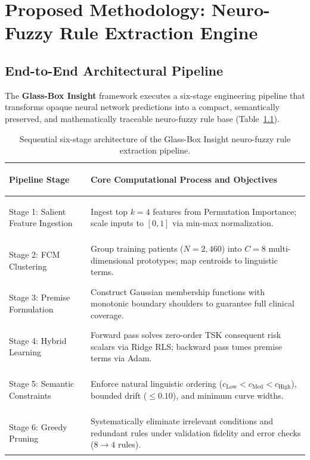 \documentclass{report}
\begin{document}
\chapter{Proposed Methodology: Neuro-Fuzzy Rule Extraction Engine}

\section{End-to-End Architectural Pipeline}

The \textbf{Glass-Box Insight} framework executes a six-stage engineering pipeline that transforms opaque neural network predictions into a compact, semantically preserved, and mathematically traceable neuro-fuzzy rule base (Table~\ref{tab:methodology_pipeline}).

\begin{table}[htbp]
    \centering
    \footnotesize
    \renewcommand{\arraystretch}{0.80}
    \begin{tabularx}{\textwidth}{>{\bfseries\raggedright\arraybackslash}p{3.5cm} >{\raggedright\arraybackslash}X}
    \toprule
    \textbf{Pipeline Stage} & \textbf{Core Computational Process and Objectives} \\
    \midrule
    Stage 1: Salient Feature Ingestion & Ingest top $k=4$ features from Permutation Importance; scale inputs to $[0, 1]$ via min-max normalization. \\
    \midrule
    Stage 2: FCM Clustering & Group training patients ($N=2{,}460$) into $C=8$ multi-dimensional prototypes; map centroids to linguistic terms. \\
    \midrule
    Stage 3: Premise Formulation & Construct Gaussian membership functions with monotonic boundary shoulders to guarantee full clinical coverage. \\
    \midrule
    Stage 4: Hybrid Learning & Forward pass solves zero-order TSK consequent risk scalars via Ridge RLS; backward pass tunes premise terms via Adam. \\
    \midrule
    Stage 5: Semantic Constraints & Enforce natural linguistic ordering ($c_{\text{Low}} < c_{\text{Med}} < c_{\text{High}}$), bounded drift ($\le 0.10$), and minimum curve widths. \\
    \midrule
    Stage 6: Greedy Pruning & Systematically eliminate irrelevant conditions and redundant rules under validation fidelity and error checks ($8 \to 4$ rules). \\
    \bottomrule
    \end{tabularx}
    \caption[Six-Stage Glass-Box Extraction Architecture]{Sequential six-stage architecture of the Glass-Box Insight neuro-fuzzy rule extraction pipeline.}
    \label{tab:methodology_pipeline}
\end{table}
\end{document}

